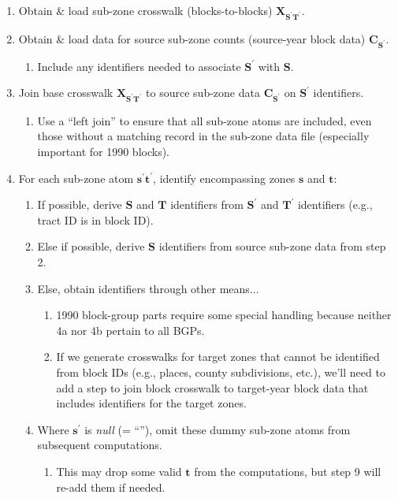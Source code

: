 \documentclass{article}
\begin{document}
\begin{enumerate}
  \item Obtain \& load sub-zone crosswalk (blocks-to-blocks) $\bm{X_{\mathbf{S^\prime T^\prime}}}$.
  \item Obtain \& load data for source sub-zone counts (source-year block data) $\bm{C_{\mathbf{S^\prime}}}$.
  \begin{enumerate}
    \item Include any identifiers needed to associate $\mathbf{S^\prime}$ with $\mathbf{S}$.
  \end{enumerate}
  \item Join base crosswalk $\bm{X_{\mathbf{S^\prime T^\prime}}}$ to source sub-zone data $\bm{C_{\mathbf{S^\prime}}}$ on $\mathbf{S^\prime}$ identifiers.
    \begin{enumerate}
     \item Use a ``left join'' to ensure that all sub-zone atoms are included, even those without a matching record in the sub-zone data file (especially important for 1990 blocks).
     \end{enumerate}
   \item For each sub-zone atom $\bm{s^\prime t^\prime}$, identify encompassing zones $\bm{s}$ and $\bm{t}$:
  \begin{enumerate}
    \item If possible, derive $\mathbf{S}$ and $\mathbf{T}$ identifiers from $\mathbf{S^\prime}$ and $\mathbf{T^\prime}$ identifiers (e.g., tract ID is in block ID).
    \item Else if possible, derive $\mathbf{S}$ identifiers from source sub-zone data from step 2.
    \item Else, obtain identifiers through other means...
      \begin{enumerate}
      \item 1990 block-group parts require some special handling because neither 4a nor 4b pertain to all BGPs.
      \item If we generate crosswalks for target zones that cannot be identified from block IDs (e.g., places, county subdivisions, etc.), we'll need to add a step to join block crosswalk to target-year block data that includes identifiers for the target zones.
     \end{enumerate}
   \item Where $\bm{s^\prime}$ is \textit{null} (= ``''), omit these dummy sub-zone atoms from subsequent computations.
      \begin{enumerate}
      \item This may drop some valid $\bm{t}$ from the computations, but step 9 will re-add them if needed.

\end{enumerate}
\end{enumerate}
\end{enumerate}
\end{document}
